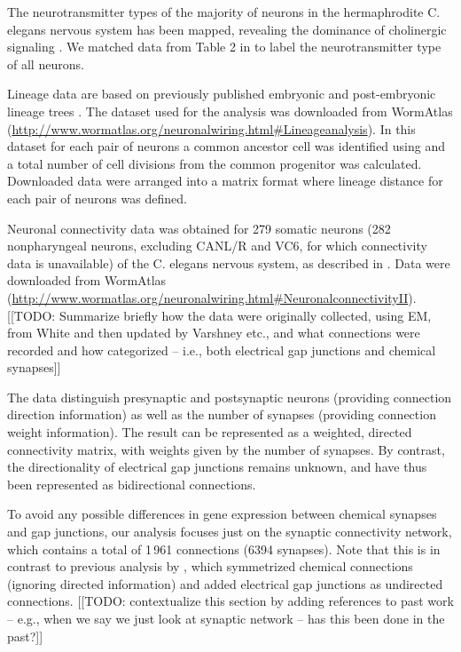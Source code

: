 \documentclass[10pt,letterpaper]{article}
\begin{document}
The neurotransmitter types of the majority of neurons in the hermaphrodite C. elegans nervous system has been mapped, revealing the dominance of cholinergic signaling \cite{Pereira:2015er}.
We matched data from Table 2 in \citet{Pereira:2015er} to label the neurotransmitter type of all neurons.

Lineage data are based on previously published embryonic and  post-embryonic lineage trees \citep{Sulston1977, Sulston1983}. 
The dataset used for the analysis was downloaded from WormAtlas (\url{http://www.wormatlas.org/neuronalwiring.html#Lineageanalysis}).
In this dataset for each pair of neurons a common ancestor cell was identified using and a total number of cell divisions from the common progenitor was calculated.  
Downloaded data were arranged into a matrix format where lineage distance for each pair of neurons was defined. %

Neuronal connectivity data was obtained for 279 somatic neurons (282 nonpharyngeal neurons, excluding CANL/R and VC6, for which connectivity data is unavailable) of the C. elegans nervous system, as described in \citet{Varshney2011}.
Data were downloaded from WormAtlas (\url{http://www.wormatlas.org/neuronalwiring.html#NeuronalconnectivityII}).
[[TODO: Summarize briefly how the data were originally collected, using EM, from White and then updated by Varshney etc., and what connections were recorded and how categorized -- i.e., both electrical gap junctions and chemical synapses]]

The data distinguish presynaptic and postsynaptic neurons (providing connection direction information) as well as the number of synapses (providing connection weight information).
The result can be represented as a weighted, directed connectivity matrix, with weights given by the number of synapses.
By contrast, the directionality of electrical gap junctions remains unknown, and have thus been represented as bidirectional connections.

To avoid any possible differences in gene expression between chemical synapses and gap junctions, our analysis focuses just on the synaptic connectivity network, which contains a total of 1\,961 connections (6394 synapses).
Note that this is in contrast to previous analysis by \citet{Towlson:2013gf}, which symmetrized chemical connections (ignoring directed information) and added electrical gap junctions as undirected connections.
[[TODO: contextualize this section by adding references to past work -- e.g., when we say we just look at synaptic network -- has this been done in the past?]]
\end{document}
